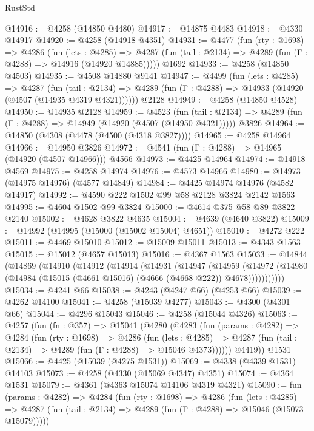 \begin{lexlean}{RustStd}
\begin{coremodule}
{\begin{coremodule}
{{{{{{{{{{{{{{{{@14916 := @4258 (@14850 @4480)
@14917 := @14875 @4483
@14918 := @4330 @14917
@14920 := @4258 (@14918 @4351)
@14931 := @4477
    (fun (rty : @1698) =>
    @4286
      (fun (lets : @4285) =>
      @4287 (fun (tail : @2134) => @4289 (fun (Γ : @4288) => @14916 (@14920 @14885)))))
    @1692
@14933 := @4258 (@14850 @4503)
@14935 := @4508 @14880 @9141
@14947 := @4499
    (fun (lets : @4285) =>
    @4287
      (fun (tail : @2134) =>
      @4289 (fun (Γ : @4288) => @14933 (@14920 (@4507 (@14935 @4319 @4321))))))
    @2128
@14949 := @4258 (@14850 @4528)
@14950 := @14935 @2128
@14959 := @4523
    (fun (tail : @2134) => @4289 (fun (Γ : @4288) => @14949 (@14920 (@4507 (@14950 @4321)))))
    @3826
@14964 := @14850 (@4308 (@4478 (@4500 (@4318 @3827))))
@14965 := @4258 @14964
@14966 := @14950 @3826
@14972 := @4541 (fun (Γ : @4288) => @14965 (@14920 (@4507 @14966))) @4566
@14973 := @4425 @14964
@14974 := @14918 @4569
@14975 := @4258 @14974
@14976 := @4573 @14966
@14980 := @14973 (@14975 @14976) (@4577 @14849)
@14984 := @4425 @14974 @14976 (@4582 @14917)
@14992 := @4590 @222 @1502 @99 @58 @2128 @3824 @2142 @1563
@14995 := @4604 @1502 @99 @3824
@15000 := @4614 @375 @58 @89 @3822 @2140
@15002 := @4628 @3822 @4635
@15004 := @4639 (@4640 @3822)
@15009 := @14992 (@14995 (@15000 (@15002 @15004) @4651))
@15010 := @4272 @222
@15011 := @4469 @15010
@15012 := @15009 @15011
@15013 := @4343 @1563
@15015 := @15012 (@4657 @15013)
@15016 := @4367 @1563
@15033 := @14844
    (@14869
      (@14910
        (@14912
          (@14914
            (@14931
              (@14947
                (@14959
                  (@14972
                    (@14980 (@14984 (@15015 (@4661 @15016) (@4666 (@4668 @222)) @4678)))))))))))
@15034 := @4241 @66
@15038 := @4243 (@4247 @66) (@4253 @66)
@15039 := @4262 @14100
@15041 := @4258 (@15039 @4277)
@15043 := @4300 (@4301 @66)
@15044 := @4296 @15043
@15046 := @4258 (@15044 @4326)
@15063 := @4257
    (fun (fn : @357) =>
    @15041
      (@4280
        (@4283
          (fun (params : @4282) =>
          @4284
            (fun (rty : @1698) =>
            @4286
              (fun (lets : @4285) =>
              @4287 (fun (tail : @2134) => @4289 (fun (Γ : @4288) => @15046 @4373))))))
        @4419))
    @1531
@15066 := @4425 (@15039 (@4275 @1531))
@15069 := @4338 (@4339 @1531) @14103
@15073 := @4258 (@4330 (@15069 @4347) @4351)
@15074 := @4364 @1531
@15079 := @4361 (@4363 @15074 @14106 @4319 @4321)
@15090 := fun (params : @4282) =>
  @4284
    (fun (rty : @1698) =>
    @4286
      (fun (lets : @4285) =>
      @4287 (fun (tail : @2134) => @4289 (fun (Γ : @4288) => @15046 (@15073 @15079)))))
}}}}}}}}}}}}}}}}
\end{coremodule}}
\end{coremodule}
\end{lexlean}
